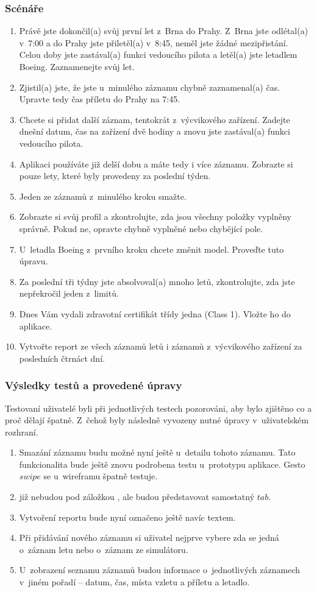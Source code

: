 \documentclass[thesis=M,czech]{FITthesis}[2012/06/26]
\begin{document}
\subsubsection{Scénáře}
\begin{enumerate}
\item Právě jste dokončil(a) svůj první let z~Brna do Prahy. Z~Brna jste odlétal(a) v~7:00 a do Prahy jste přiletěl(a) v~8:45, neměl jste žádné mezipřistání. Celou doby jste zastával(a) funkci vedoucího pilota a letěl(a) jste letadlem Boeing. Zaznamenejte svůj let.
\item Zjistil(a) jste, že jste u~minulého záznamu chybně zaznamenal(a) čas. Upravte tedy čas příletu do Prahy na 7:45.
\item Chcete si přidat další záznam, tentokrát z~výcvikového zařízení. Zadejte dnešní datum, čas na zařízení dvě hodiny a znovu jste zastával(a) funkci vedoucího pilota.
\item Aplikaci používáte již delší dobu a máte tedy i více záznamu. Zobrazte si pouze lety, které byly provedeny za poslední týden.
\item Jeden ze záznamů z~minulého kroku smažte.
\item Zobrazte si svůj profil a zkontrolujte, zda jsou všechny položky vyplněny správně. Pokud ne, opravte chybně vyplněné nebo chybějící pole.
\item U~letadla Boeing z~prvního kroku chcete změnit model. Proveďte tuto úpravu.
\item Za poslední tři týdny jste absolvoval(a) mnoho letů, zkontrolujte, zda jste nepřekročil jeden z~limitů.
\item Dnes Vám vydali zdravotní certifikát třídy jedna (Class 1). Vložte ho do aplikace.
\item Vytvořte report ze všech záznamů letů i záznamů z~výcvikového zařízení za posledních čtrnáct dní.
\end{enumerate}

\subsubsection{Výsledky testů a provedené úpravy}
Testovaní uživatelé byli při jednotlivých testech pozorováni, aby bylo zjištěno co a proč dělají špatně. Z~čehož byly následně vyvozeny nutné úpravy v~uživatelském rozhraní.

\begin{enumerate}
\item Smazání záznamu budu možné nyní ještě u~detailu tohoto záznamu. Tato funkcionalita bude ještě znovu podrobena testu u~prototypu aplikace. Gesto $swipe$ se u~wireframu špatně testuje.
\item {} již nebudou pod záložkou , ale budou představovat samostatný $tab$.
\item Vytvoření reportu bude nyní označeno ještě navíc textem.
\item Při přidávání nového záznamu si uživatel nejprve vybere zda se jedná o~záznam letu nebo o~záznam ze simulátoru.
\item U~zobrazení seznamu záznamů budou informace o~jednotlivých záznamech v~jiném pořadí -- datum, čas, místa vzletu a příletu a letadlo.
\end{enumerate}
\end{document}
